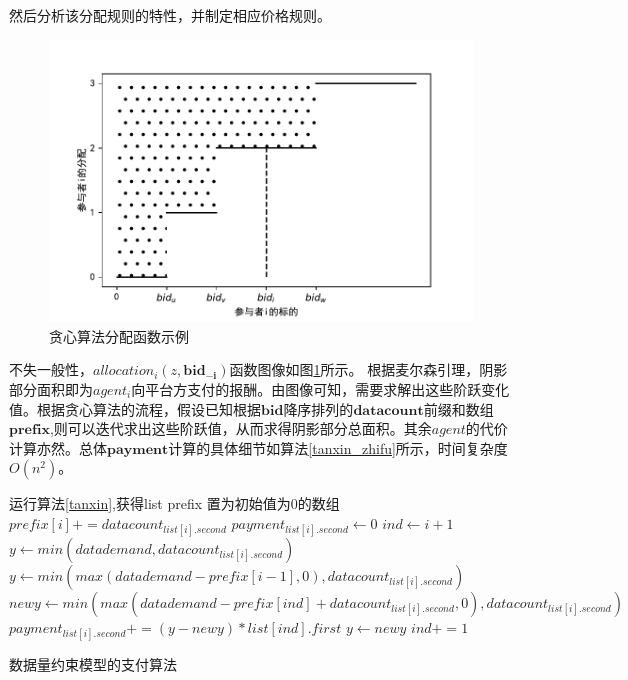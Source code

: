 \documentclass[promaster]{thesis-uestc}
\begin{document}
然后分析该分配规则的特性，并制定相应价格规则。

\begin{figure}[H]
    \includegraphics[width=350pt]{pic/tanxin_allocation.pdf}
    \caption{贪心算法分配函数示例}
    \label{tanxin_allocation}
\end{figure}

不失一般性，$allocation_i(z,\mathbf{bid_{-i}})$函数图像如图\ref{tanxin_allocation}所示。
根据麦尔森引理，阴影部分面积即为$agent_i$向平台方支付的报酬。由图像可知，需要求解出这些阶跃变化值。根据贪心算法的流程，假设已知根据$\mathbf{bid}$降序排列的$\mathbf{datacount}$前缀和数组$\mathbf{prefix}$,则可以迭代求出这些阶跃值，从而求得阴影部分总面积。其余$agent$的代价计算亦然。总体$\mathbf{payment}$计算的具体细节如算法\ref{tanxin_zhifu}所示，时间复杂度$O(n^2)$。

\begin{algorithm}[h]
    运行算法\ref{tanxin},获得list\;
    prefix 置为初始值为0的数组\;
    {
        $prefix[i]  += datacount_{list[i].second}$\;
    }
    {
        $payment_{list[i].second} \leftarrow 0$\;
        $ind \leftarrow i + 1$
        {
            $y \leftarrow min(datademand,datacount_{list[i].second})$\;
        }{
        $y \leftarrow min(max(datademand - prefix[i-1],0),datacount_{list[i].second})$\;
        }
        {
            $newy \leftarrow min(max(datademand - prefix[ind]+ datacount_{list[i].second},0),datacount_{list[i].second})$\;
            $payment_{list[i].second} += (y - newy)*list[ind].first$\;
            $y \leftarrow newy$\;
            $ind += 1$\;
        }
    }
\caption{数据量约束模型的支付算法}
\label{tanxin_zhifu}
\end{algorithm}
\end{document}
